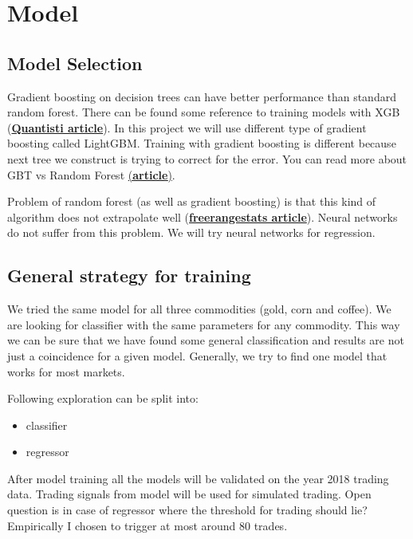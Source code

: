 \documentclass[final,2p]{elsarticle}
\begin{document}
\clearpage

\section{Model}

\subsection{Model Selection}
Gradient boosting on decision trees can have better performance than standard random forest.
There can be found some reference to training models with XGB (\href{https://www.quantinsti.com/blog/forecasting-markets-using-extreme-gradient-boosting-xgboost}{\textbf{Quantisti article}}).
In this project we will use different type of gradient boosting called LightGBM.
Training with gradient boosting is different because next tree we construct is trying to correct for the error.
You can read more about GBT vs Random Forest \href{https://medium.com/@aravanshad/gradient-boosting-versus-random-forest-cfa3fa8f0d80}{(\textbf{article})}.

Problem of random forest (as well as gradient boosting) is that this kind of algorithm does not extrapolate well (\href{http://freerangestats.info/blog/2016/12/10/extrapolation}{\textbf{freerangestats article}}).
Neural networks do not suffer from this problem. We will try neural networks for regression.

\subsection{General strategy for training}
We tried the same model for all three commodities (gold, corn and coffee). We are looking for classifier with the same parameters for any commodity. This way we can be sure that we have found some general classification and results are not just a coincidence for a given model.
Generally, we try to find one model that works for most markets.

Following exploration can be split into:

\begin{itemize}
    \item classifier
    \item regressor
\end{itemize}

After model training all the models will be validated on the year 2018 trading data. Trading signals from model will be used for simulated trading. Open question is in case of regressor where the threshold for trading should lie?
Empirically I chosen to trigger at most around $80$ trades.
\end{document}

